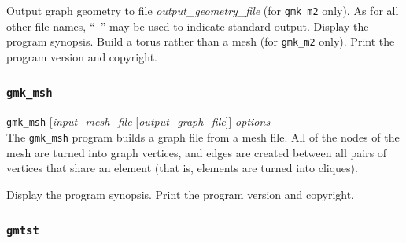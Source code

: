 \begin{itemize}
\progopt
\begin{itemize}
Output graph geometry to file {\it output\_geometry\_file}
(for \texttt{gmk\_m2} only).
As for all other file names, ``\texttt{-}''
may be used to indicate standard output.
\iteme[\texttt{-h}]
Display the program synopsis.
\iteme[\texttt{-t}]
Build a torus rather than a mesh (for \texttt{gmk\_m2} only).
\iteme[\texttt{-V}]
Print the program version and copyright.
\end{itemize}
\end{itemize}

\subsubsection{\texttt{gmk\_msh}}
\label{sec-prog-gmkmsh}

\begin{itemize}
\progsyn
\texttt{gmk\_msh} [{\it input\_mesh\_file} [{\it output\_graph\_file}]] {\it options}\\

\progdes
The \texttt{gmk\_msh} program builds a graph file from a mesh file. All
of the nodes of the mesh are turned into graph vertices, and edges
are created between all pairs of vertices that share an element (that
is, elements are turned into cliques).

\progopt
\begin{itemize}
\iteme[\texttt{-h}]
Display the program synopsis.
\iteme[\texttt{-V}]
Print the program version and copyright.
\end{itemize}
\end{itemize}

\subsubsection{\texttt{gmtst}}

